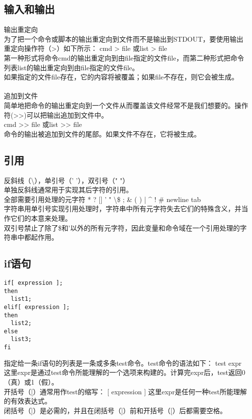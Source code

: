 \documentclass[11pt,a4paper,titlepage]{article}
\begin{document}
{\subsection{\kai 输入和输出}
输出重定向\\
为了把一个命令或脚本的输出重定向到文件而不是输出到STDOUT，要使用输出重定向操作符（>）如下所示：
cmd > file     或list > file\\
第一种形式将命令cmd的输出重定向到由file指定的文件file，而第二种形式把命令列表list的输出重定向到由file指定的文件file。\\
如果指定的文件file存在，它的内容将被覆盖；如果file不存在，则它会被生成。\\
\\
追加到文件\\
简单地把命令的输出重定向到一个文件从而覆盖该文件经常不是我们想要的。操作符(>>)可以把输出追加到文件中。\\
cmd >> file     或list >> file\\
命令的输出被追加到文件的尾部。如果文件不存在，它将被生成。\\

\subsection{\kai 引用}
反斜线（\textbackslash），单引号（' '），双引号（" "）\\
单独反斜线通常用于实现其后字符的引用。\\
全部需要引用处理的元字符 * ? $[$$]$ ' " \textbackslash \$ ; \& ( ) | \^{} ! \# newline tab\\
字符串用单引号实现引用处理时，字符串中所有元字符失去它们的特殊含义，并当作它们的本意来处理。\\
双引号禁止了除了\$和'以外的所有元字符，因此变量和命令域在一个引用处理的字符串中都起作用。 \\

\subsection{\kai if语句}
\begin{lstlisting}
if[ expression ];
then
  list1;
elif[ expression ];
then
  list2;
else
  list3;
fi
\end{lstlisting}
指定给一条if语句的列表是一条或多条test命令。test命令的语法如下：  test expr\\
这里expr是通过test命令所能理解的一个选项来构建的。计算完expr后，test返回0（真）或1（假）。\\
开括号（[）通常用作test的缩写： [ expression ]   这里expr是任何一种test所能理解的有效表达式。\\
闭括号（]）是必需的，并且在闭括号（]）前和开括号（[）后都需要空格。\\
}
\end{document}
